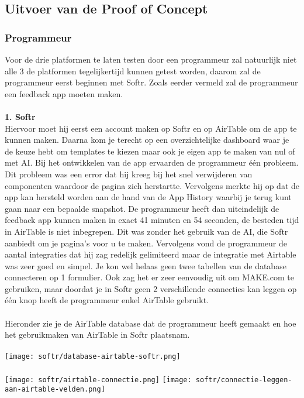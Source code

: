 \subsection*{Uitvoer van de Proof of Concept}
\subsubsection*{Programmeur}
Voor de drie platformen te laten testen door een programmeur zal natuurlijk niet alle 3 de platformen tegelijkertijd 
kunnen getest worden, daarom zal de programmeur eerst beginnen met Softr. 
Zoals eerder vermeld zal de programmeur een feedback app moeten maken.
\\
\\
\textbf{1. Softr}
\\
Hiervoor moet hij eerst een account maken op Softr en op AirTable om de app te kunnen maken. 
Daarna kom je terecht op een overzichtelijke dashboard waar je de keuze hebt om templates te kiezen maar 
ook je eigen app te maken van nul of met AI. Bij het ontwikkelen van de app ervaarden de programmeur één probleem. 
Dit probleem was een error dat hij kreeg bij het snel verwijderen van componenten waardoor de pagina zich herstartte. 
Vervolgens merkte hij op dat de app kan hersteld worden aan de hand van de App History waarbij je terug kunt gaan 
naar een bepaalde snapshot. De programmeur heeft dan uiteindelijk de feedback app 
kunnen maken in exact 41 minuten en 54 seconden, de besteden tijd in AirTable is niet inbegrepen. 
Dit was zonder het gebruik van de AI, die Softr aanbiedt om je pagina’s voor u te maken. Vervolgens vond 
de programmeur de aantal integraties dat hij zag redelijk gelimiteerd maar de integratie met Airtable was 
zeer goed en simpel. Je kon wel helaas geen twee tabellen van de database connecteren op 1 formulier. 
Ook zag het er zeer eenvoudig uit om MAKE.com te gebruiken, maar doordat je in Softr geen 2 verschillende connecties 
kan leggen op één knop heeft de programmeur enkel AirTable gebruikt.
\\
\\
Hieronder zie je de AirTable database dat de programmeur heeft gemaakt en hoe het gebruikmaken van AirTable in Softr plaatsnam.
\\
\\
\texttt{[image: softr/database-airtable-softr.png]}
\\
\\
\texttt{[image: softr/airtable-connectie.png]}
\texttt{[image: softr/connectie-leggen-aan-airtable-velden.png]}

